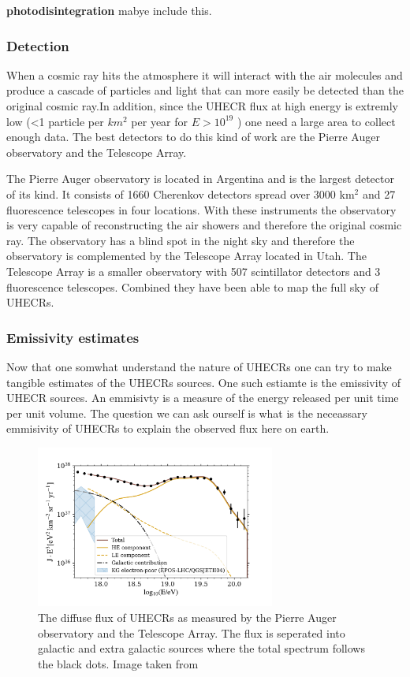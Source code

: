 \documentclass{article}
\begin{document}
\textbf{photodisintegration}
mabye include this. 

\subsubsection{Detection}
When a cosmic ray hits the atmosphere it will interact with the air molecules and produce a cascade of particles and light that can more easily be detected than 
the original cosmic ray.In addition, since the UHECR flux at high energy is extremly low (<1 particle per $km^2$ per year for $E > 10^{19}$ ) one need a large area to collect enough data. 
The best detectors to do this kind of work are the Pierre Auger observatory and the Telescope Array. 

The Pierre Auger observatory is located in Argentina and is the largest detector of its kind. It consists of 1660  Cherenkov detectors spread over 3000 km$^2$ and 27 fluorescence telescopes in four locations. With 
these instruments the observatory is very capable of reconstructing the air showers and therefore the original cosmic ray. The observatory has a blind spot in the night sky 
and therefore the observatory is complemented by the Telescope Array located in Utah. The Telescope Array is a smaller observatory with 507 scintillator detectors and 3 fluorescence telescopes. Combined they have been able to map the full sky of UHECRs.  

\subsubsection{Emissivity estimates}

Now that one somwhat understand the nature of UHECRs one can try to make tangible estimates of the UHECRs sources. One such
estiamte is the emissivity of UHECR sources. An emmisivty is a measure of the energy released per unit time per unit volume. The question 
we can ask ourself is what is the neceassary emmisivity of UHECRs to explain the observed flux here on earth.


\begin{figure}
    \centering
    \includegraphics[width = 0.7\textwidth]{UHECRs.png}
    \caption{The diffuse flux of UHECRs as measured by the Pierre Auger observatory and the Telescope Array. The flux is seperated into galactic and extra galactic sources where the total spectrum follows the black dots. Image taken from \cite{Abdul_Halim_2023}}
    \label{fig:flux_UHECRs}
\end{figure}
\end{document}
